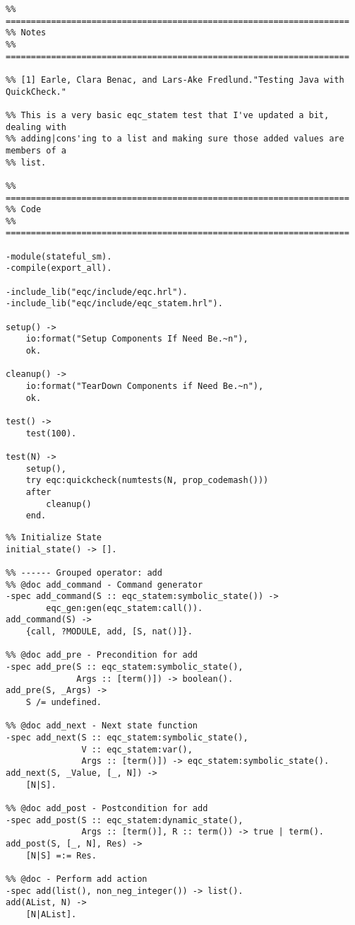 \documentclass[presentation, bigger]{beamer}
\begin{document}
\begin{frame}[fragile,shrink,label=sec-]{}
 \begin{verbatim}
%% ====================================================================
%% Notes
%% ====================================================================

%% [1] Earle, Clara Benac, and Lars-Ake Fredlund."Testing Java with QuickCheck."

%% This is a very basic eqc_statem test that I've updated a bit, dealing with
%% adding|cons'ing to a list and making sure those added values are members of a
%% list.

%% ====================================================================
%% Code
%% ====================================================================

-module(stateful_sm).
-compile(export_all).

-include_lib("eqc/include/eqc.hrl").
-include_lib("eqc/include/eqc_statem.hrl").

setup() ->
    io:format("Setup Components If Need Be.~n"),
    ok.

cleanup() ->
    io:format("TearDown Components if Need Be.~n"),
    ok.

test() ->
    test(100).

test(N) ->
    setup(),
    try eqc:quickcheck(numtests(N, prop_codemash()))
    after
        cleanup()
    end.
\end{verbatim}
\end{frame}
\begin{frame}[fragile,shrink,label=sec-]{}
 \begin{verbatim}
%% Initialize State
initial_state() -> [].

%% ------ Grouped operator: add
%% @doc add_command - Command generator
-spec add_command(S :: eqc_statem:symbolic_state()) ->
        eqc_gen:gen(eqc_statem:call()).
add_command(S) ->
    {call, ?MODULE, add, [S, nat()]}.

%% @doc add_pre - Precondition for add
-spec add_pre(S :: eqc_statem:symbolic_state(),
              Args :: [term()]) -> boolean().
add_pre(S, _Args) ->
    S /= undefined.

%% @doc add_next - Next state function
-spec add_next(S :: eqc_statem:symbolic_state(),
               V :: eqc_statem:var(),
               Args :: [term()]) -> eqc_statem:symbolic_state().
add_next(S, _Value, [_, N]) ->
    [N|S].

%% @doc add_post - Postcondition for add
-spec add_post(S :: eqc_statem:dynamic_state(),
               Args :: [term()], R :: term()) -> true | term().
add_post(S, [_, N], Res) ->
    [N|S] =:= Res.

%% @doc - Perform add action
-spec add(list(), non_neg_integer()) -> list().
add(AList, N) ->
    [N|AList].
\end{verbatim}
\end{frame}
\end{document}
